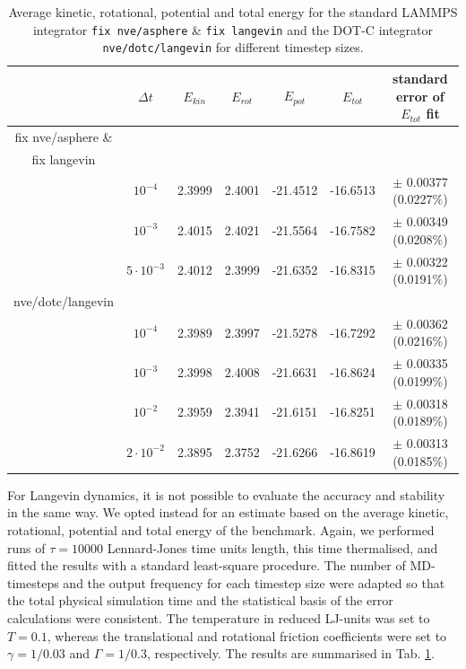\documentclass[12pt,onecolumn]{article}
\begin{document}
\begin{table}[htpb]
\begin{center}
\begin{tabular}{ | c | c | c | c | c | c | c |}
\hline
& $\Delta t$ & $E_{kin}$ & $E_{rot}$ & $E_{pot}$ & $E_{tot}$ & standard error of $E_{tot}$ fit\\
\hline
\hline
fix nve/asphere \& & & & & & &\\
fix langevin & & & & & &\\
\hline
& $10^{-4}$ &2.3999 &2.4001  &-21.4512 &-16.6513 & $\pm$ 0.00377  (0.0227\%)\\
\hline
& $10^{-3}$ & 2.4015  &2.4021  &-21.5564 &-16.7582 & $\pm$ 0.00349 (0.0208\%)\\
\hline
& $5\cdot10^{-3}$ &2.4012  &2.3999  &-21.6352  &-16.8315  & $\pm$ 0.00322 (0.0191\%)  \\
\hline
\hline
nve/dotc/langevin & & & & &\\
\hline
& $10^{-4}$ &2.3989 &2.3997 &-21.5278 &-16.7292 & $\pm$ 0.00362 (0.0216\%)\\
\hline
& $10^{-3}$ &2.3998 &2.4008 &-21.6631 &-16.8624 & $\pm$ 0.00335 (0.0199\%)\\
\hline
& $10^{-2}$ & 2.3959 & 2.3941  &-21.6151 &-16.8251 & $\pm$ 0.00318 (0.0189\%) \\
\hline
& $2\cdot10^{-2}$ &2.3895  & 2.3752 &-21.6266   &-16.8619  & $\pm$ 0.00313 (0.0185\%)\\
\hline
\end{tabular}
\end{center}
\caption{\label{table1} Average kinetic, rotational, potential and total energy for the standard LAMMPS integrator \texttt{fix nve/asphere} \&
\texttt{fix langevin} and the DOT-C integrator \texttt{nve/dotc/langevin} for different timestep sizes.}
\end{table}   

For Langevin dynamics, it is not possible to evaluate the accuracy and stability in the same way.
We opted instead for an estimate based on the average kinetic, rotational, potential and
total energy of the benchmark. Again, we performed runs of $\tau=10000$ Lennard-Jones time units length, this time thermalised, 
and fitted the results with a standard least-square procedure. The number of MD-timesteps and the output frequency for each timestep size 
were adapted so that the total physical simulation time and the statistical basis of the error calculations were consistent. 
The temperature in reduced LJ-units was set to $T=0.1$, whereas the translational and rotational friction coefficients 
were set to $\gamma=1/0.03$ and $\Gamma=1/0.3$, respectively.
The results are summarised in Tab. \ref{table1}.
\end{document}
